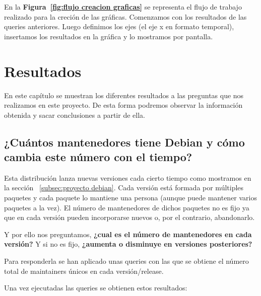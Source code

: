 \documentclass[a4paper, 12pt]{book}
\begin{document}
En la \textbf{Figura~\ref{fig:flujo creacion graficas}} se representa el flujo de trabajo realizado para la creción de las gráficas. Comenzamos con los resultados de las queries anteriores. Luego definimos los ejes (el eje x en formato temporal), insertamos los resultados en la gráfica y lo mostramos por pantalla.


\cleardoublepage
\chapter{Resultados}
\label{chap:resultados}

En este capítulo se muestran los diferentes resultados a las preguntas que nos realizamos en este proyecto. De esta forma podremos observar la información obtenida y sacar conclusiones a partir de ella.

\section{¿Cuántos mantenedores tiene Debian y cómo cambia este número con el tiempo?}
\label{sec:pregunta_1}
Esta distribución lanza nuevas versiones cada cierto tiempo como mostramos en la sección ~\ref{subsec:proyecto debian}. Cada versión está formada por múltiples paquetes y cada paquete lo mantiene una persona (aunque puede mantener varios paquetes a la vez). El número de mantenedores de dichos paquetes no es fijo ya que en cada versión pueden incorporarse nuevos o, por el contrario, abandonarlo.

Y por ello nos preguntamos,  \textbf{¿cual es el número de mantenedores en cada versión?} Y si no es fijo, \textbf{¿aumenta o disminuye en versiones posteriores?}

Para responderla se han aplicado unas queries con las que se obtiene el número total de maintainers únicos en cada versión/release.

Una vez ejecutadas las queries se obtienen estos resultados:
\end{document}
